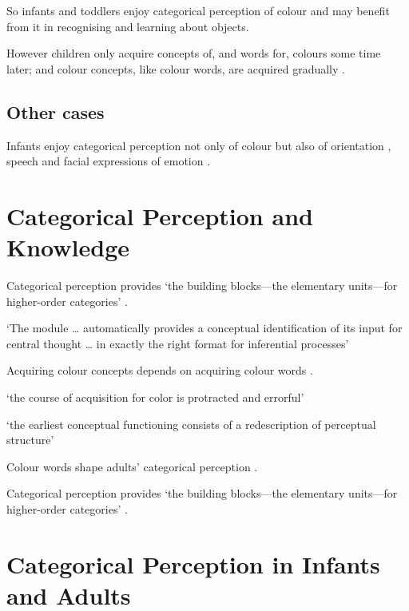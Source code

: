 \documentclass[12pt]{extarticle}
\begin{document}
\begin{multicols}{3}
So infants and toddlers enjoy categorical perception of colour and may benefit from it in recognising and learning about objects.
 
However children only acquire concepts of, and words for, colours some time later; and colour concepts, like colour words, are acquired gradually \citep{Pitchford:2005hm,Kowalski:2006hk,Sandhofer:1999if,Sandhofer:2006qo}.
 
\subsection{Other cases}
 
Infants enjoy categorical perception not only of colour but also of orientation \citep{franklin:2010_hemispheric}, speech \citep{Kuhl:1987la,Kuhl:2004nv,Jusczyk:1995it} and facial expressions of emotion \citep{Etcoff:1992zd,Kotsoni:2001ph,Campanella:2002aa}.
 
 
 
\section{Categorical Perception and Knowledge}
 
Categorical perception provides ‘the building blocks—the elementary units—for higher-order categories’
\citep[p.\ 3]{Harnad:1987ej}.
 
‘The module … automatically provides a conceptual identification of its input for central thought … in exactly the right format for inferential processes’
\citep[pp.\ 193--4]{Leslie:1988ct}
 
Acquiring colour concepts depends on acquiring colour words
\citep{Kowalski:2006hk}.
 
‘the course of acquisition for color is protracted and errorful’
\citep{Sandhofer:2006qo}
 
‘the earliest conceptual functioning consists of a redescription of perceptual structure’
\citep{Mandler:1992vn}
 
Colour words shape adults’ categorical perception \citep{Roberson:2007wg,Winawer:2007im}.
 
Categorical perception provides ‘the building blocks—the elementary units—for higher-order categories’
\citep[p.\ 3]{Harnad:1987ej}.
 
 
 
\section{Categorical Perception in Infants and Adults}
 

\end{multicols}
\end{document}
